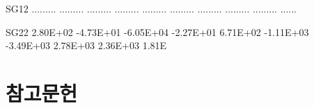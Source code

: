 \documentclass[
  11pt,
  krantz2, a4paper, twoside]{krantz}
\newenvironment{Shaded}{\begin{snugshade}}{\end{snugshade}}
\newcommand{\FloatTok}[1]{\textcolor[rgb]{0.00,0.00,0.81}{#1}}
\newcommand{\NormalTok}[1]{#1}
\theoremstyle{definition}
\theoremstyle{definition}
\theoremstyle{definition}
\theoremstyle{remark}
\begin{document}
\begin{Shaded}
\begin{Highlighting}[]
\NormalTok{SG12   ......... ......... ......... ......... ......... ......... ......... ......... ......... ......}
                                                                                                       
\NormalTok{SG22    }\FloatTok{2.80E+02} \FloatTok{{-}4.73E+01} \FloatTok{{-}6.05E+04} \FloatTok{{-}2.27E+01}  \FloatTok{6.71E+02} \FloatTok{{-}1.11E+03} \FloatTok{{-}3.49E+03}  \FloatTok{2.78E+03}  \FloatTok{2.36E+03}  \FloatTok{1.81}\NormalTok{E}
\end{Highlighting}
\end{Shaded}

\normalsize

\backmatter

\hypertarget{uxcc38uxace0uxbb38uxd5cc}{%
\chapter*{참고문헌}\label{uxcc38uxace0uxbb38uxd5cc}}
\end{document}
